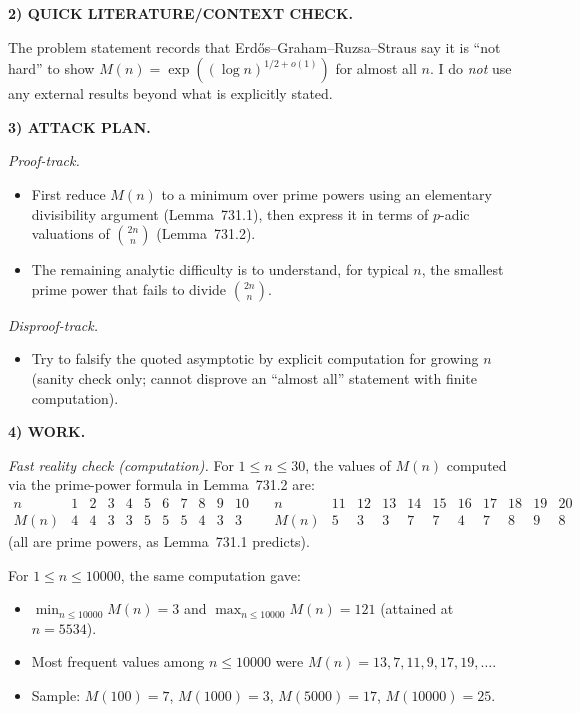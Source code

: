 \medskip
\noindent\textbf{2) QUICK LITERATURE/CONTEXT CHECK.}

The problem statement records that Erd\H{o}s--Graham--Ruzsa--Straus say it is ``not hard'' to show
$M(n)=\exp((\log n)^{1/2+o(1)})$ for almost all $n$. I do \emph{not} use any external results beyond what is explicitly stated.

\medskip
\noindent\textbf{3) ATTACK PLAN.}

\emph{Proof-track.}
\begin{itemize}
\item First reduce $M(n)$ to a minimum over prime powers using an elementary divisibility argument (Lemma~731.1), then express it in terms of $p$-adic valuations of $\binom{2n}{n}$ (Lemma~731.2).
\item The remaining analytic difficulty is to understand, for typical $n$, the smallest prime power that fails to divide $\binom{2n}{n}$.
\end{itemize}
\emph{Disproof-track.}
\begin{itemize}
\item Try to falsify the quoted asymptotic by explicit computation for growing $n$ (sanity check only; cannot disprove an ``almost all'' statement with finite computation).
\end{itemize}

\medskip
\noindent\textbf{4) WORK.}

\noindent\emph{Fast reality check (computation).}
For $1\le n\le 30$, the values of $M(n)$ computed via the prime-power formula in Lemma~731.2 are:
\[
\begin{array}{c|cccccccccc}
 n&1&2&3&4&5&6&7&8&9&10\\\hline
 M(n)&4&4&3&3&5&5&5&4&3&3
\end{array}
\quad
\begin{array}{c|cccccccccc}
 n&11&12&13&14&15&16&17&18&19&20\\\hline
 M(n)&5&3&3&7&7&4&7&8&9&8
\end{array}
\]
(all are prime powers, as Lemma~731.1 predicts).

For $1\le n\le 10000$, the same computation gave:
\begin{itemize}
\item $\min_{n\le 10000} M(n)=3$ and $\max_{n\le 10000} M(n)=121$ (attained at $n=5534$).
\item Most frequent values among $n\le 10000$ were $M(n)=13,7,11,9,17,19,\dots$.
\item Sample: $M(100)=7$, $M(1000)=3$, $M(5000)=17$, $M(10000)=25$.
\end{itemize}

